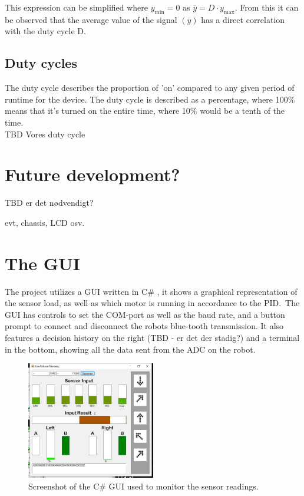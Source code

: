 This expression can be simplified where $y_\mathrm{min}=0$ as $\overline{y}=D \cdot y_\mathrm{max}$. From this it can be observed that the average value of the signal $(\overline{y})$ has a direct correlation with the duty cycle D. 

\subsection{Duty cycles}
 The duty cycle describes the proportion of 'on' compared to any given period of runtime for the device. The duty cycle is described as a percentage, where 100\% means that it's turned on the entire time, where 10\% would be a tenth of the time.\\
TBD Vores duty cycle

\section{Future development?}
TBD er det nødvendigt?

evt, chassis, LCD osv. 

\section{The GUI}
The project utilizes a GUI written in C\# , it shows a graphical representation of the sensor load, as well as which motor is running in accordance to the PID.\
The GUI has controls to set the COM-port as well as the baud rate, and a button prompt to connect and disconnect the robots blue-tooth transmission. It also features a decision history on the right (TBD - er det der stadig?) and a terminal in the bottom, showing all the data sent from the ADC on the robot.

\begin{figure}[h!]
  \centering
  \includegraphics[width=0.5\textwidth]{figures/guiexample.png}  
\caption{Screenshot of the C\# GUI used to monitor the sensor readings.}  
  \label{PID controller}
\end{figure}